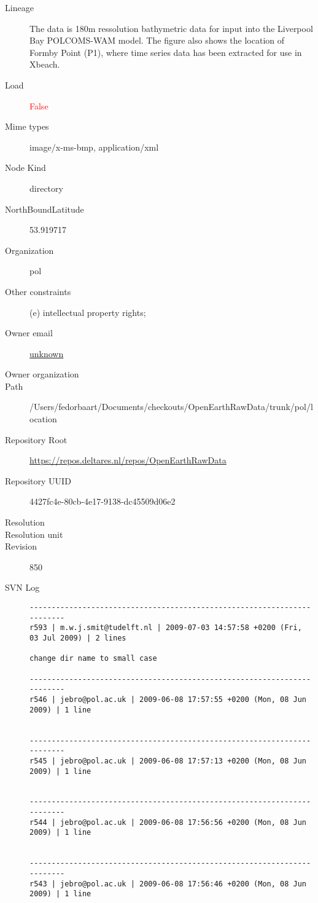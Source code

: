 \documentclass[9]{report}
\begin{document}
\begin{description}
  \item[Lineage] The data is 180m ressolution bathymetric data for input into the Liverpool Bay POLCOMS-WAM model.  The figure also shows the location of Formby Point (P1), where time series data has been extracted for use in Xbeach.
  \item[Load] \textcolor{red}{False}
  \item[Mime types] image/x-ms-bmp, application/xml
  \item[Node Kind] directory
  \item[NorthBoundLatitude] 53.919717
  \item[Organization] pol
  \item[Other constraints] (e) intellectual property rights;
  \item[Owner email] \href{mailto:unknown}{unknown}
  \item[Owner organization] 
  \item[Path] /Users/fedorbaart/Documents/checkouts/OpenEarthRawData/trunk/pol/location
  \item[Repository Root] \href{https://repos.deltares.nl/repos/OpenEarthRawData}{https://repos.deltares.nl/repos/OpenEarthRawData}
  \item[Repository UUID] 4427fc4e-80cb-4e17-9138-dc45509d06e2
  \item[Resolution] 
  \item[Resolution unit] 
  \item[Revision] 850
  \item[SVN Log] \begin{verbatim}
------------------------------------------------------------------------
r593 | m.w.j.smit@tudelft.nl | 2009-07-03 14:57:58 +0200 (Fri, 03 Jul 2009) | 2 lines

change dir name to small case

------------------------------------------------------------------------
r546 | jebro@pol.ac.uk | 2009-06-08 17:57:55 +0200 (Mon, 08 Jun 2009) | 1 line


------------------------------------------------------------------------
r545 | jebro@pol.ac.uk | 2009-06-08 17:57:13 +0200 (Mon, 08 Jun 2009) | 1 line


------------------------------------------------------------------------
r544 | jebro@pol.ac.uk | 2009-06-08 17:56:56 +0200 (Mon, 08 Jun 2009) | 1 line


------------------------------------------------------------------------
r543 | jebro@pol.ac.uk | 2009-06-08 17:56:46 +0200 (Mon, 08 Jun 2009) | 1 line



\end{verbatim}
\end{description}
\end{document}
